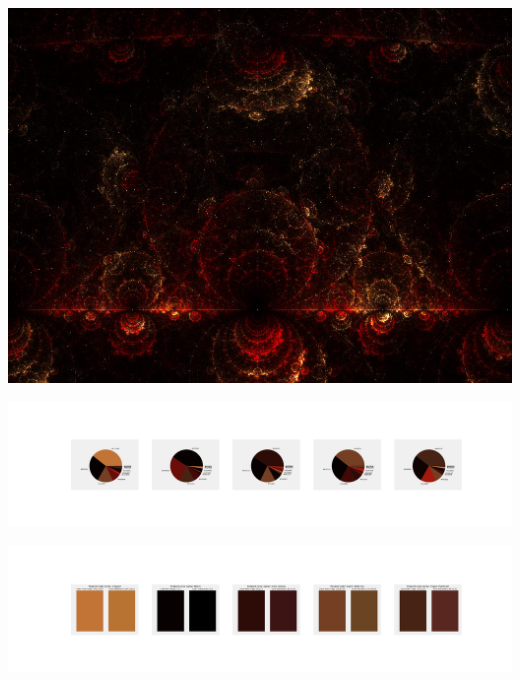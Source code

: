 \documentclass[11pt]{article}
\begin{document}
\begin{landscape}
    \begin{center}
    \includegraphics[width=\textwidth]{./nbimg/file (97).jpg}
    \end{center}

    \begin{center}
    \includegraphics[width=250mm]{./nbimg/pie-448.jpg}
    \end{center}

    \begin{center}
    \includegraphics[width=250mm]{./nbimg/peak-448.jpg}
    \end{center}
    


\end{landscape}
\end{document}
